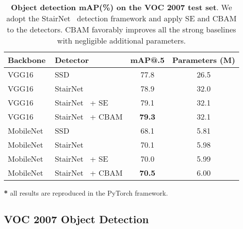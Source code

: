 \documentclass[runningheads]{llncs}
\begin{document}
\begin{table}[t]
\begin{center}
\setlength{\tabcolsep}{2pt}
\begin{tabular}{ l|l|c|c}
\hline
Backbone & Detector & mAP@.5 & Parameters (M) \\
\hline
\hline
VGG16~\cite{simonyan2014very} & SSD~\cite{liu2016ssd}        &  77.8  & 26.5\\
VGG16~\cite{simonyan2014very} &
StairNet~\cite{woo2017stairnet} & 78.9 & 32.0\\
VGG16~\cite{simonyan2014very} &
StairNet~\cite{woo2017stairnet} + SE~\cite{hu2017squeeze} & 79.1 & 32.1\\
VGG16~\cite{simonyan2014very} &
StairNet~\cite{woo2017stairnet} + CBAM & \textbf{79.3} & 32.1\\
\hline
MobileNet~\cite{howard2017mobilenets} & SSD~\cite{liu2016ssd}        &  68.1   & 5.81\\
MobileNet~\cite{howard2017mobilenets} &
StairNet~\cite{woo2017stairnet} & 70.1 & 5.98\\
MobileNet~\cite{howard2017mobilenets} &
StairNet~\cite{woo2017stairnet} + SE~\cite{hu2017squeeze} & 70.0 & 5.99\\
MobileNet~\cite{howard2017mobilenets} &
StairNet~\cite{woo2017stairnet} + CBAM                   & \textbf{70.5} &6.00\\
\hline
\end{tabular}
\end{center}
\begin{tablenotes}
\scriptsize
\item \vspace{-3mm}\hspace*{\fill} \textbf{*} all results are reproduced in the PyTorch framework.
\end{tablenotes}\vspace{2mm}
\caption{\textbf{Object detection mAP(\%) on the VOC 2007 test set}. We adopt the StairNet~\cite{woo2017stairnet} detection framework and apply SE and CBAM to the detectors. CBAM favorably improves all the strong baselines with negligible additional parameters.}
\label{table:voc_detect}
\vspace{-6mm}
\end{table}

\subsection{VOC 2007 Object Detection}
\end{document}
